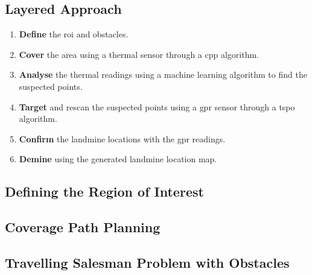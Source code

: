 \subsection{Layered Approach}

\begin{enumerate}
    \item \textbf{Define} the \gls{roi} and obstacles.
    \item \textbf{Cover} the area using a thermal sensor through a \gls{cpp} algorithm.
    \item \textbf{Analyse} the thermal readings using a machine learning algorithm to find the suspected points.
    \item \textbf{Target} and rescan the suspected points using a \gls{gpr} sensor through a \gls{tspo} algorithm.
    \item \textbf{Confirm} the landmine locations with the \gls{gpr} readings. 
    \item \textbf{Demine} using the generated landmine location map. 
\end{enumerate}

\subsection{Defining the Region of Interest}

\subsection{Coverage Path Planning}

\subsection{Travelling Salesman Problem with Obstacles}


